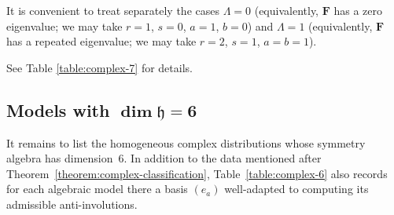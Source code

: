\documentclass[10pt,a4paper]{amsart}
\newcommand{\mbF}{\mathbf{F}}
\newcommand{\mfh} {\mathfrak{h}}
\numberwithin{equation}{section}
\begin{document}
It is convenient to treat separately the cases $\Lambda = 0$ (equivalently, $\mbF$ has a zero eigenvalue; we may take $r = 1$, $s = 0$, $a = 1$, $b = 0$) and $\Lambda = 1$ (equivalently, $\mbF$ has a repeated eigenvalue; we may take $r = 2$, $s = 1$, $a = b = 1$).

See Table \ref{table:complex-7} for details.

\subsection[Models with $\dim \mfh = 6$]{Models with $\boldsymbol{\dim \mfh = 6}$}
It remains to list the homogeneous complex distributions whose symmetry algebra has dimen\-sion~$6$. In addition to the data mentioned after Theorem~\ref{theorem:complex-classification}, Table~\ref{table:complex-6} also records for each algebraic model there a basis $(e_a)$ well-adapted to computing its admissible anti-involutions.
\end{document}
